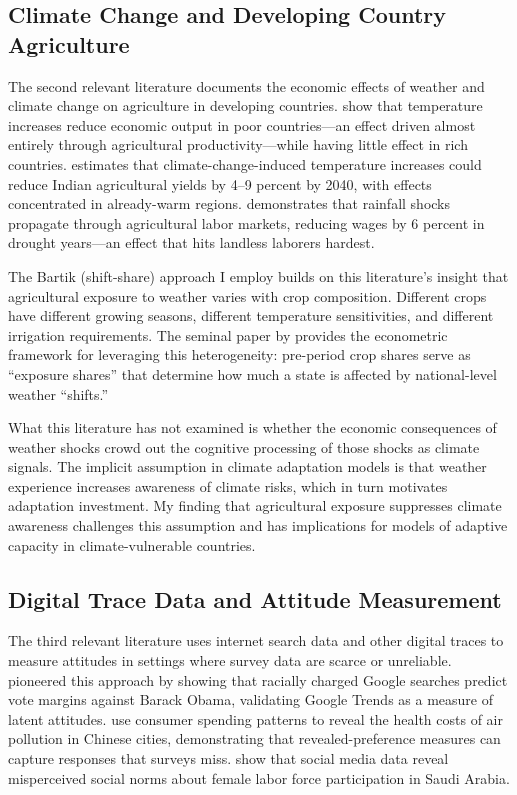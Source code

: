 \documentclass[12pt]{article}
\begin{document}
\subsection{Climate Change and Developing Country Agriculture}

The second relevant literature documents the economic effects of weather and climate change on agriculture in developing countries. \citet{delljonesolen2012} show that temperature increases reduce economic output in poor countries---an effect driven almost entirely through agricultural productivity---while having little effect in rich countries. \citet{guiteras2009} estimates that climate-change-induced temperature increases could reduce Indian agricultural yields by 4--9 percent by 2040, with effects concentrated in already-warm regions. \citet{jayachandran2006} demonstrates that rainfall shocks propagate through agricultural labor markets, reducing wages by 6 percent in drought years---an effect that hits landless laborers hardest.

The Bartik (shift-share) approach I employ builds on this literature's insight that agricultural exposure to weather varies with crop composition. Different crops have different growing seasons, different temperature sensitivities, and different irrigation requirements. The seminal paper by \citet{goldsmithpinkham2020} provides the econometric framework for leveraging this heterogeneity: pre-period crop shares serve as ``exposure shares'' that determine how much a state is affected by national-level weather ``shifts.''

What this literature has not examined is whether the economic consequences of weather shocks crowd out the cognitive processing of those shocks as climate signals. The implicit assumption in climate adaptation models is that weather experience increases awareness of climate risks, which in turn motivates adaptation investment. My finding that agricultural exposure suppresses climate awareness challenges this assumption and has implications for models of adaptive capacity in climate-vulnerable countries.

\subsection{Digital Trace Data and Attitude Measurement}

The third relevant literature uses internet search data and other digital traces to measure attitudes in settings where survey data are scarce or unreliable. \citet{stephensetal2014} pioneered this approach by showing that racially charged Google searches predict vote margins against Barack Obama, validating Google Trends as a measure of latent attitudes. \citet{barwick2020} use consumer spending patterns to reveal the health costs of air pollution in Chinese cities, demonstrating that revealed-preference measures can capture responses that surveys miss. \citet{bursztyn2019} show that social media data reveal misperceived social norms about female labor force participation in Saudi Arabia.
\end{document}
